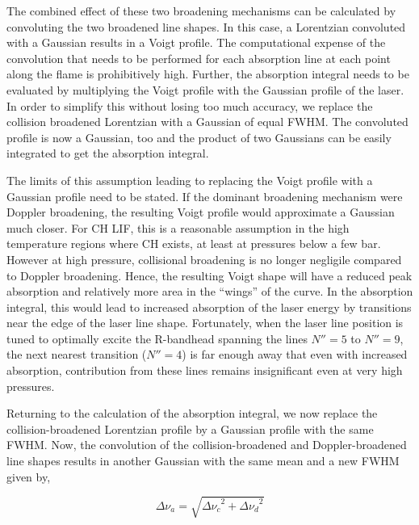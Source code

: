 The combined effect of these two broadening mechanisms can be calculated by convoluting the two broadened line shapes.
In this case, a Lorentzian convoluted with a Gaussian results in a Voigt profile.
The computational expense of the convolution that needs to be performed for each absorption line at each point along the flame is prohibitively high.
Further, the absorption integral needs to be evaluated by multiplying the Voigt profile with the Gaussian profile of the laser.
In order to simplify this without losing too much accuracy, we replace the collision broadened Lorentzian with a Gaussian of equal FWHM.
The convoluted profile is now a Gaussian, too and the product of two Gaussians can be easily integrated to get the absorption integral.

The limits of this assumption leading to replacing the Voigt profile with a Gaussian profile need to be stated.
If the dominant broadening mechanism were Doppler broadening, the resulting Voigt profile would approximate a Gaussian much closer. For CH LIF, this is a reasonable assumption in the high temperature regions where CH exists, at least at pressures below a few bar. However at high pressure,  collisional broadening is no longer negligile compared to Doppler broadening.
Hence, the resulting Voigt shape will have a reduced peak absorption and relatively more area in the ``wings'' of the curve.
In the absorption integral, this would lead to increased absorption of the laser energy by transitions near the edge of the laser line shape.
Fortunately, when the laser line position is tuned to optimally excite the R-bandhead spanning the lines \(N''=5\) to \(N''=9\), the next nearest transition (\(N''=4\)) is far enough away that even with increased absorption, contribution from these lines remains insignificant even at very high pressures.

Returning to the calculation of the absorption integral, we now replace the collision-broadened Lorentzian profile by a Gaussian profile with the same FWHM.
Now, the convolution of the collision-broadened and Doppler-broadened line shapes results in another Gaussian with the same mean and a new FWHM given by,

\begin{equation}
  \Delta\nu_a = \sqrt{ { \Delta\nu_c }^2 + { \Delta\nu_d }^2 }
  \label{eqn:broadening}
\end{equation}


